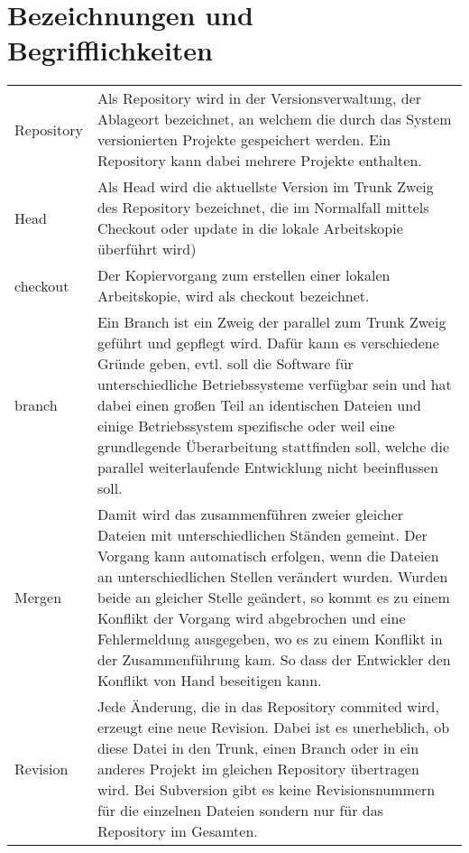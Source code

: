 \chapter*{Bezeichnungen und Begrifflichkeiten}
\begin{center}


\begin{longtable}{lp{11cm}}
Repository  & Als Repository wird in der Versionsverwaltung, der Ablageort bezeichnet, an welchem die durch das System versionierten Projekte gespeichert werden. Ein Repository kann dabei mehrere Projekte enthalten. \\

Head & Als Head wird die aktuellste Version im Trunk Zweig des Repository bezeichnet, die im Normalfall mittels Checkout oder update in die lokale Arbeitskopie überführt wird) \\

checkout & Der Kopiervorgang zum erstellen einer lokalen Arbeitskopie, wird als checkout bezeichnet.  \\

branch & Ein Branch ist ein Zweig der parallel zum Trunk Zweig geführt und gepflegt wird. Dafür kann es verschiedene Gründe geben, evtl. soll die Software für unterschiedliche Betriebssysteme verfügbar sein und hat dabei einen großen Teil an identischen Dateien und einige Betriebssystem spezifische oder weil eine grundlegende Überarbeitung stattfinden soll, welche die parallel weiterlaufende Entwicklung nicht beeinflussen soll. \\

Mergen & Damit wird das zusammenführen zweier gleicher Dateien mit unterschiedlichen Ständen gemeint. Der Vorgang kann automatisch erfolgen, wenn die Dateien an unterschiedlichen Stellen verändert wurden. Wurden beide an gleicher Stelle geändert, so kommt es zu einem Konflikt der Vorgang wird abgebrochen und eine Fehlermeldung ausgegeben, wo es zu einem Konflikt in der Zusammenführung kam. So dass der Entwickler den Konflikt von Hand beseitigen kann. \\

Revision & Jede Änderung, die in das Repository commited wird, erzeugt eine neue Revision. Dabei ist es unerheblich, ob diese Datei in den Trunk, einen Branch oder in ein anderes Projekt im gleichen Repository übertragen wird. Bei Subversion gibt es keine Revisionsnummern für die einzelnen Dateien sondern nur für das Repository im Gesamten. \\


\end{longtable}
\end{center}
